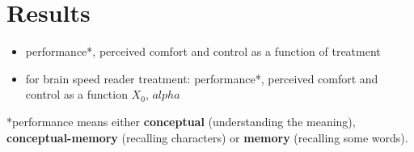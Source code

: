 \section{Results}
\label{results}

\begin{itemize}
  \item performance*, perceived comfort and control as a function of treatment 
  \item for brain speed reader treatment:  performance*, perceived comfort and control as a function $X_0$, $alpha$
\end{itemize}

*performance means either {\bf conceptual} (understanding the meaning), {\bf conceptual-memory} (recalling characters) or {\bf memory} (recalling some words).

